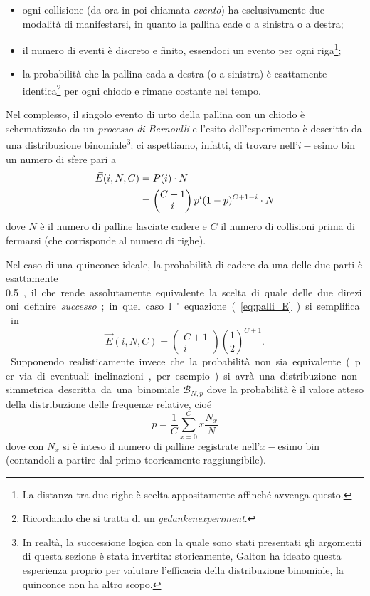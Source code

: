 \documentclass[10pt,oneside,a4paper]{article}
\begin{document}
\begin{itemize}
	\item ogni collisione (da ora in poi chiamata \emph{evento}) ha esclusivamente due modalità di manifestarsi, in quanto la pallina cade o a sinistra o a destra;
	\item il numero di eventi è discreto e finito, essendoci un evento per ogni riga\footnote{La distanza tra due righe è scelta appositamente affinché avvenga questo.};
	\item la probabilità che la pallina cada a destra (o a sinistra) è esattamente identica\footnote{Ricordando che si tratta di un \emph{gedankenexperiment}.} per ogni chiodo e rimane costante nel tempo.
\end{itemize} Nel complesso, il singolo evento di urto della pallina con un chiodo è schematizzato da un \emph{processo di Bernoulli} e l'esito dell'esperimento è descritto da una distribuzione binomiale\footnote{In realtà, la successione logica con la quale sono stati presentati gli argomenti di questa sezione è stata invertita: storicamente, Galton ha ideato questa esperienza proprio per valutare l'efficacia della distribuzione binomiale, la quinconce non ha altro scopo.}: ci aspettiamo, infatti, di trovare nell'$i-$esimo bin un numero di sfere pari a 
\begin{align}\label{eq:palli_E}
	\vec{E}(i, N, C) &= P(i) \cdot N \notag \\
		&= \begin{pmatrix} C+1 \\ i \end{pmatrix} p^i (1-p)^{C+1-i}\cdot N
\end{align}
dove $N$ è il numero di palline lasciate cadere e $C$ il numero di collisioni prima di fermarsi (che corrisponde al numero di righe). 

Nel caso di una quinconce ideale, la probabilità di cadere da una delle due parti è esattamente \SI{0.5}, il che rende assolutamente equivalente la scelta di quale delle due direzioni definire \emph{successo}; in quel caso l'equazione (\ref{eq:palli_E}) si semplifica in
\begin{equation}\label{eq:palli_E_teorico}
	\vec{E}(i, N, C) = \begin{pmatrix} C+1 \\ i \end{pmatrix} \left(\frac{1}{2}\right)^{C+1}.
\end{equation}

Supponendo realisticamente invece che la probabilità non sia equivalente (per via di eventuali inclinazioni, per esempio) si avrà una distribuzione non simmetrica descritta da una binomiale $\mathscr{B}_{N, p}$ dove la probabilità è il valore atteso della distribuzione delle frequenze relative, cioé
\begin{equation}\label{eq:palli_P_vero}
	 p = \frac{1}{C} \sum_{x=0}^{C} x \frac{N_x}{N}
\end{equation} dove con $N_x$ si è inteso il numero di palline registrate nell'$x-$esimo bin (contandoli a partire dal primo teoricamente raggiungibile).
\end{document}
